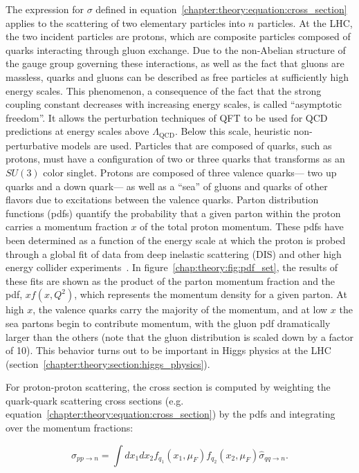 The expression for $\sigma$ defined in
equation~\ref{chapter:theory:equation:cross_section} applies to the
scattering of two elementary particles into $n$ particles. At the LHC,
the two incident particles are protons, which are composite particles
composed of quarks interacting through gluon exchange. Due to the
non-Abelian structure of the gauge group governing these interactions,
as well as the fact that gluons are massless, quarks and gluons can be
described as free particles at sufficiently high energy scales. This
phenomenon, a consequence of the fact that the strong coupling
constant decreases with increasing energy scales, is called
``asymptotic freedom''. It allows the perturbation techniques of QFT
to be used for QCD predictions at energy scales above
$\Lambda_{\textrm{QCD}}$. Below this scale, heuristic non-perturbative
models are used. Particles that are composed of quarks, such as
protons, must have a configuration of two or three quarks that
transforms as an $SU(3)$ color singlet. Protons are composed of three
valence quarks--- two up quarks and a down quark--- as well as a
``sea'' of gluons and quarks of other flavors due to excitations
between the valence quarks. Parton distribution functions (pdfs)
quantify the probability that a given parton within the proton carries
a momentum fraction $x$ of the total proton momentum. These pdfs have
been determined as a function of the energy scale at
which the proton is probed through a global fit of data from deep inelastic scattering (DIS) and
other high energy collider experiments~\cite{bib:Martin:2009iq}. In
figure~\ref{chap:theory:fig:pdf_set}, the results of these fits are
shown as the product of the parton momentum fraction and the pdf,
$xf(x,Q^2)$, which represents the momentum density for a given
parton. At high $x$, the valence quarks carry the majority of the
momentum, and at low $x$ the sea partons begin to contribute momentum,
with the gluon pdf dramatically larger than the others (note that the
gluon distribution is scaled down by a factor of 10). This behavior
turns out to be important in Higgs physics at the LHC
(section~\ref{chapter:theory:section:higgs_physics}).

For proton-proton scattering, the cross section
is computed by weighting the quark-quark scattering cross
sections (e.g. equation~\ref{chapter:theory:equation:cross_section})
by the pdfs and integrating over the momentum fractions:

\begin{equation}
\sigma_{pp\rightarrow{n}} = \int dx_1 dx_2 f_{q_1}(x_1,\mu_F)
  f_{q_2}(x_2,\mu_F) \hat{\sigma}_{qq\rightarrow{n}}.
\label{chapter:theory:equation:cross_section_pp}
\end{equation}

